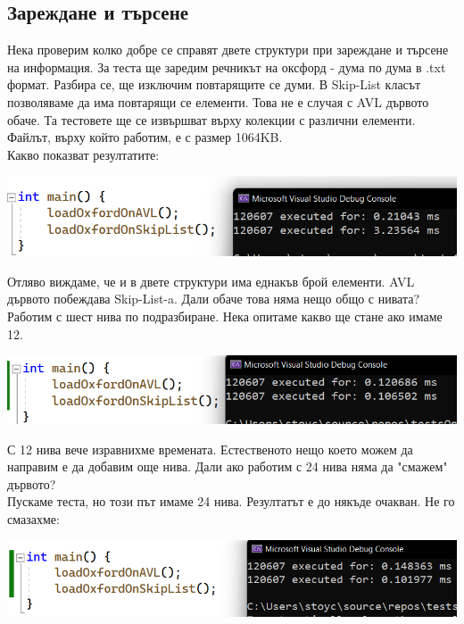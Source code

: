 \documentclass[a4paper,12pt,fleqn]{article}
\begin{document}
	\subsection{Зареждане и търсене}
	Нека проверим колко добре се справят двете структури при зареждане и търсене на информация. За теста ще заредим речникът на оксфорд - дума по дума в .txt формат. Разбира се, ще изключим повтарящите се думи. В Skip-List класът позволяваме да има повтарящи се елементи. Това не е случая с AVL дървото обаче. Та тестовете ще се извършват върху колекции с различни елементи. Файлът, върху който работим, е с размер 1064KB.\\
	Какво показват резултатите:\\
	\begin{center}
	\includegraphics[scale=0.4]{oxford-load.png}\\
	\end{center}
	Отляво виждаме, че и в двете структури има еднакъв брой елементи. AVL дървото побеждава Skip-List-a. Дали обаче това няма нещо общо с нивата? Работим с шест нива по подразбиране. Нека опитаме какво ще стане ако имаме 12.\\
	\begin{center}
	\includegraphics[scale=0.4]{oxford-load-2.png}\\
	\end{center}
	С 12 нива вече изравнихме времената. Естественото нещо което можем да направим е да добавим още нива. Дали ако работим с 24 нива няма да "смажем" дървото?\\
	Пускаме теста, но този път имаме 24 нива. Резултатът е до някъде очакван. Не го смазахме:\\
	\begin{center}
	\includegraphics[scale=0.4]{oxford-load-3.png}\\
	\end{center}
\end{document}
